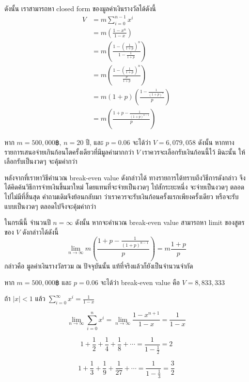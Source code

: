 ดังนั้น เราสามารถหา closed form ของมูลค่าเงินรางวัลได้ดังนี้
\begin{align*}
V
&=m\sum_{i=0}^{n-1}x^i \\
&=m\left(\frac{1-x^n}{1-x}\right) \\
&=m\left(\frac{1-\left(\frac{1}{1+p}\right)^n}{1-\frac{1}{1+p}}\right) \\
&=m\left(\frac{1-\left(\frac{1}{1+p}\right)^n}{\frac{p}{1+p}}\right) \\
&=m(1+p)\left(\frac{1-\frac{1}{(1+p)^n}}{p}\right) \\
&=m\left(\frac{1+p-\frac{1}{(1+p)^{n-1}}}{p}\right)
\end{align*}
%
\begin{example}
หาก $m=500{,}000฿$, $n=20$ ปี, และ $p=0.06$ จะได้ว่า $V=6{,}079{,}058$ \enskip ดังนั้น หากทางรายการเสนอจ่ายเกินก้อนโตครั้งเดียวที่มีมูลค่ามากกว่า $V$ เราควรจะเลือกรับเงินก้อนนี้ไว้ มิฉะนั้น ให้เลือกรับเป็นงวดๆ จะคุ้มค่ากว่า
\end{example}

หลังจากที่เราหาวิธีคำนวณ break-even value ดังกล่าวได้ ทางรายการได้ทราบถึงวิธีการดังกล่าว จึงได้คิดค้นวิธีการจ่ายเงินขึ้นมาใหม่ โดยแทนที่จะจ่ายเป็นงวดๆ ไปสักระยะหนึ่ง จะจ่ายเป็นงวดๆ ตลอดไปไม่มีที่สิ้นสุด คำถามเดิมจึงย้อนกลับมา ว่าเราควรจะรับเงินก้อนครั้งแรกเพียงครั้งเดียว หรือจะรับแบบเป็นงวดๆ ตลอดไปจึงจะคุ้มค่ากว่า

ในกรณีนี้ จำนวนปี $n=\infty$ ดังนั้น หากจะคำนวณ break-even value สามารถหา limit ของสูตรของ $V$ ดังกล่าวได้ดังนี้ \[\lim_{n\to\infty}{m\left(\frac{1+p-\frac{1}{(1+p)^{n-1}}}{p}\right)}=m\frac{1+p}{p}\] กล่าวคือ มูลค่าเงินรางวัลรวม ณ ปัจจุบันนั้น แท้ที่จริงแล้วก็ยังเป็นจำนวนจำกัด
%
\begin{example}
หาก $m=500{,}000฿$ และ $p=0.06$ จะได้ว่า break-even value คือ $V=8{,}833{,}333$
\end{example}

\begin{theorem}
ถ้า $|x|<1$ แล้ว $\sum_{i=0}^{\infty}{x^i}=\frac{1}{1-x}$
\begin{pf}
\[\lim_{n\to\infty}{\sum_{i=0}^{n}{x^i}}=\lim_{n\to\infty}{\frac{1-x^{n+1}}{1-x}}=\frac{1}{1-x}\]
\end{pf}
\end{theorem}
%
\begin{example}
\[1+\frac{1}{2}+\frac{1}{4}+\frac{1}{8}+\cdots=\frac{1}{1-\frac{1}{2}}=2\]
\end{example}
\begin{example}
\[1+\frac{1}{3}+\frac{1}{9}+\frac{1}{27}+\cdots=\frac{1}{1-\frac{1}{3}}=\frac{3}{2}\]
\end{example}

